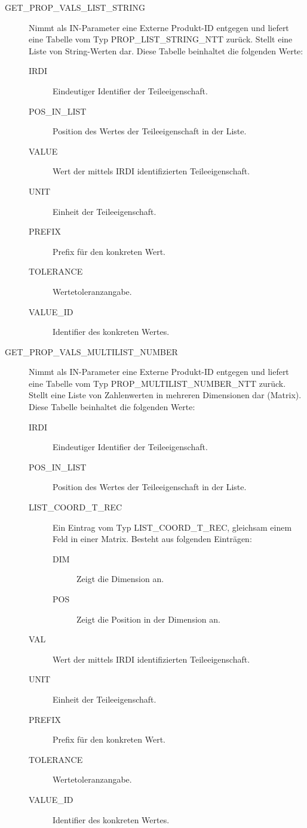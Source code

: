 \begin{description}
\item[GET\_PROP\_VALS\_LIST\_STRING] Nimmt als IN-Parameter eine Externe Produkt-ID entgegen und liefert eine Tabelle vom Typ PROP\_LIST\_STRING\_NTT zurück. Stellt eine Liste von String-Werten dar. 
Diese Tabelle beinhaltet die folgenden Werte: 

  \begin{description}
  \item[IRDI] Eindeutiger Identifier der Teileeigenschaft.
  \item[POS\_IN\_LIST] Position des Wertes der Teileeigenschaft in der Liste.
  \item[VALUE] Wert der mittels IRDI identifizierten Teileeigenschaft.
  \item[UNIT] Einheit der Teileeigenschaft.
  \item[PREFIX] Prefix für den konkreten Wert.
  \item[TOLERANCE] Wertetoleranzangabe.
  \item[VALUE\_ID] Identifier des konkreten Wertes.
  \end{description}
\item[GET\_PROP\_VALS\_MULTILIST\_NUMBER] Nimmt als IN-Parameter eine Externe Produkt-ID entgegen und liefert eine Tabelle vom Typ PROP\_MULTILIST\_NUMBER\_NTT zurück. Stellt eine Liste von Zahlenwerten in mehreren Dimensionen dar (Matrix). 
Diese Tabelle beinhaltet die folgenden Werte: 

  \begin{description}
  \item[IRDI] Eindeutiger Identifier der Teileeigenschaft.
  \item[POS\_IN\_LIST] Position des Wertes der Teileeigenschaft in der Liste.
  \item[LIST\_COORD\_T\_REC] Ein Eintrag vom Typ LIST\_COORD\_T\_REC, gleichsam einem Feld in einer Matrix. Besteht aus folgenden Einträgen:
    \begin{description}	
    \item[DIM] Zeigt die Dimension an.
    \item[POS] Zeigt die Position in der Dimension an. 
    \end{description}
  \item[VAL] Wert der mittels IRDI identifizierten Teileeigenschaft.
  \item[UNIT] Einheit der Teileeigenschaft.
  \item[PREFIX] Prefix für den konkreten Wert.
  \item[TOLERANCE] Wertetoleranzangabe.
  \item[VALUE\_ID] Identifier des konkreten Wertes.
  \end{description}


\end{description}
